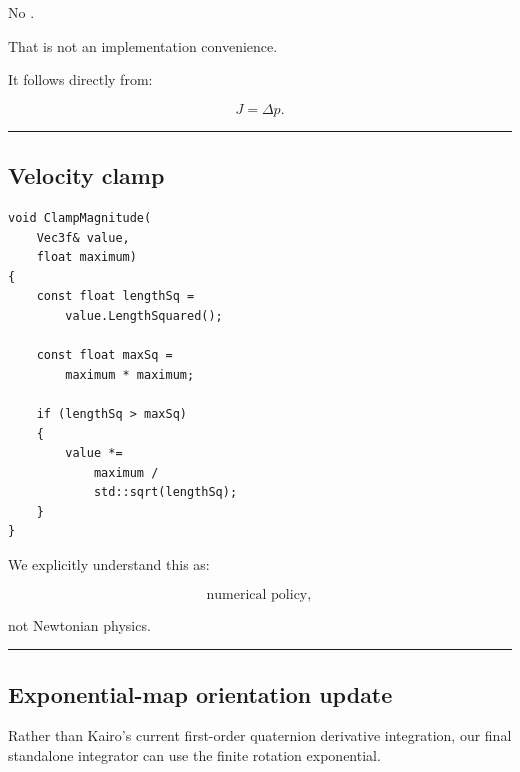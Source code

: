 No .

That is not an implementation convenience.

It follows directly from:

\[
J=\Delta p.
\]

\begin{center}\rule{0.5\linewidth}{0.5pt}\end{center}

\subsection{Velocity clamp}\label{06-engine-ii-ch039-velocity-clamp}

\hypertarget{06-engine-ii-ch039-velocity-clamp}{}

\begin{verbatim}
void ClampMagnitude(
    Vec3f& value,
    float maximum)
{
    const float lengthSq =
        value.LengthSquared();

    const float maxSq =
        maximum * maximum;

    if (lengthSq > maxSq)
    {
        value *=
            maximum /
            std::sqrt(lengthSq);
    }
}
\end{verbatim}

We explicitly understand this as:

\[
\text{numerical policy},
\]

not Newtonian physics.

\begin{center}\rule{0.5\linewidth}{0.5pt}\end{center}

\subsection{Exponential-map orientation update}\label{06-engine-ii-ch039-exponential-map-orientation-update}

\hypertarget{06-engine-ii-ch039-exponential-map-orientation-update}{}

Rather than Kairo's current first-order quaternion derivative integration, our final standalone integrator can use the finite rotation exponential.

